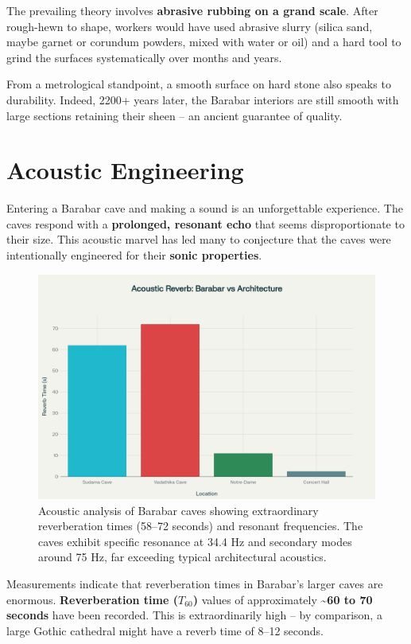 \documentclass[11pt]{article}
\begin{document}
The prevailing theory involves \textbf{abrasive rubbing on a grand scale}. After rough-hewn to shape, workers would have used abrasive slurry (silica sand, maybe garnet or corundum powders, mixed with water or oil) and a hard tool to grind the surfaces systematically over months and years.

From a metrological standpoint, a smooth surface on hard stone also speaks to durability. Indeed, 2200+ years later, the Barabar interiors are still smooth with large sections retaining their sheen -- an ancient guarantee of quality.

\section{Acoustic Engineering}

Entering a Barabar cave and making a sound is an unforgettable experience. The caves respond with a \textbf{prolonged, resonant echo} that seems disproportionate to their size. This acoustic marvel has led many to conjecture that the caves were intentionally engineered for their \textbf{sonic properties}.

\begin{figure}[H]
\centering
\includegraphics[width=0.8\linewidth]{acoustic_reverberation_chart.png}
\caption{Acoustic analysis of Barabar caves showing extraordinary reverberation times (58--72 seconds) and resonant frequencies. The caves exhibit specific resonance at 34.4 Hz and secondary modes around 75 Hz, far exceeding typical architectural acoustics.}
\label{fig:acoustic_analysis}
\end{figure}

Measurements indicate that reverberation times in Barabar's larger caves are enormous. \textbf{Reverberation time ($T_{60}$)} values of approximately \textbf{\textasciitilde 60 to 70 seconds} have been recorded. This is extraordinarily high -- by comparison, a large Gothic cathedral might have a reverb time of 8--12 seconds.
\end{document}
